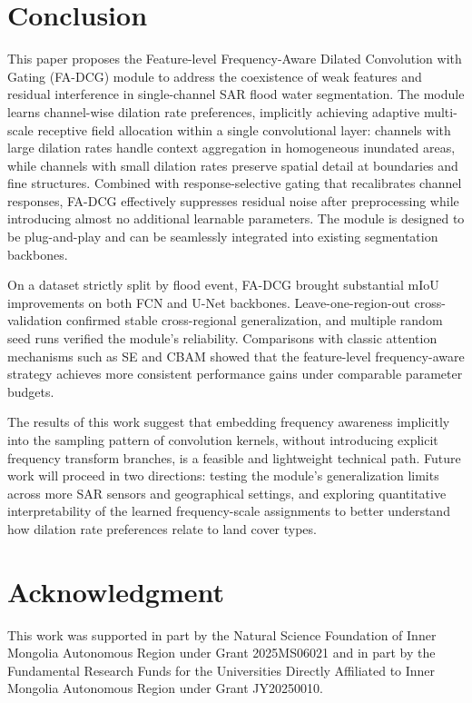 \documentclass[lettersize,journal]{IEEEtran}
\begin{document}
\section{Conclusion}
This paper proposes the Feature-level Frequency-Aware Dilated Convolution with Gating (FA-DCG) module to address the coexistence of weak features and residual interference in single-channel SAR flood water segmentation. The module learns channel-wise dilation rate preferences, implicitly achieving adaptive multi-scale receptive field allocation within a single convolutional layer: channels with large dilation rates handle context aggregation in homogeneous inundated areas, while channels with small dilation rates preserve spatial detail at boundaries and fine structures. Combined with response-selective gating that recalibrates channel responses, FA-DCG effectively suppresses residual noise after preprocessing while introducing almost no additional learnable parameters. The module is designed to be plug-and-play and can be seamlessly integrated into existing segmentation backbones.

On a dataset strictly split by flood event, FA-DCG brought substantial mIoU improvements on both FCN and U-Net backbones. Leave-one-region-out cross-validation confirmed stable cross-regional generalization, and multiple random seed runs verified the module's reliability. Comparisons with classic attention mechanisms such as SE and CBAM showed that the feature-level frequency-aware strategy achieves more consistent performance gains under comparable parameter budgets.

The results of this work suggest that embedding frequency awareness implicitly into the sampling pattern of convolution kernels, without introducing explicit frequency transform branches, is a feasible and lightweight technical path. Future work will proceed in two directions: testing the module's generalization limits across more SAR sensors and geographical settings, and exploring quantitative interpretability of the learned frequency-scale assignments to better understand how dilation rate preferences relate to land cover types.



\section*{Acknowledgment}
This work was supported in part by the Natural Science Foundation of Inner Mongolia Autonomous Region under Grant 2025MS06021 and in part by the Fundamental Research Funds for the Universities Directly Affiliated to Inner Mongolia Autonomous Region under Grant JY20250010.
\end{document}
